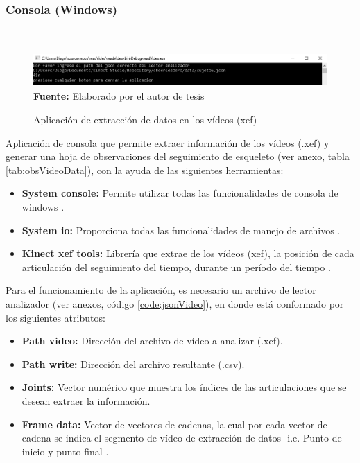 \subsubsection{Consola (Windows)}\mbox{} \\ \label{ins:cons}
\begin{figure}[H]
	\caption{Aplicaci\'on de extracci\'on de datos en los v\'ideos (xef)}
	\label{fig:appConsole}
	\centering
	\includegraphics[width=460px,height=50px]{graphics/appConsole.PNG} \\
	\textbf{Fuente:} Elaborado por el autor de tesis
\end{figure} 
Aplicaci\'on de consola que permite extraer informaci\'on de los v\'ideos (.xef) y generar una hoja de observaciones del seguimiento de esqueleto (ver anexo, tabla \ref{tab:obsVideoData}), con la ayuda de las siguientes herramientas:
\begin{itemize}
\item \textbf{System console:} Permite utilizar todas las funcionalidades de consola de windows \cite{windowConsole2019}.
\item \textbf{System io:} Proporciona todas las  funcionalidades de manejo de archivos \cite{windowIO2019}.
\item \textbf{Kinect xef tools:} Librer\'ia que extrae de los v\'ideos (xef), la posici\'on de cada articulaci\'on del seguimiento del tiempo, durante un per\'iodo del tiempo \cite{kinectXEFTools}.
\end{itemize}
Para el funcionamiento de la aplicaci\'on, es necesario un archivo de lector analizador (ver anexos, c\'odigo \ref{code:jsonVideo}), en donde est\'a conformado por los siguientes atributos:
\begin{itemize}
\item \textbf{Path video:} Direcci\'on del archivo  de v\'ideo a analizar (.xef).
\item \textbf{Path write:} Direcci\'on del archivo  resultante (.csv).
\item \textbf{Joints:} Vector num\'erico que muestra los \'indices de las articulaciones que se desean extraer la informaci\'on.
\item \textbf{Frame data:} Vector de vectores de cadenas, la cual por cada vector de cadena se indica el segmento de v\'ideo de extracci\'on de datos -i.e. Punto de inicio y punto final-.
\end{itemize}
